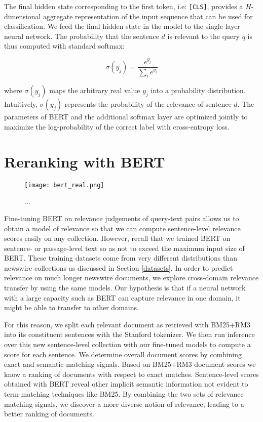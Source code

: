 The final hidden state corresponding to the first token, i.e: \texttt{[CLS]}, provides a $ H $-dimensional aggregate representation of the input sequence that can be used for classification.
We feed the final hidden state in the model to the single layer neural network.
The probability that the sentence $d$ is relevant to the query $q$ is thus computed with standard softmax:

\begin{equation}
\sigma (y_j) = \frac{e^{y_j}}{\sum_i e^{y_i}}
\end{equation}

where $\sigma (y_j)$ maps the arbitrary real value $y_j$ into a probability distribution.
Intuitively, $\sigma (y_j)$ represents the probability of the relevance of sentence $d$.
The parameters of BERT and the additional softmax layer are optimized jointly to maximize the log-probability of the correct label with cross-entropy loss.

\section{Reranking with BERT}

\begin{figure}[b!]
\centering
  \texttt{[image: bert\_real.png]}
\caption{...}
\label{fig:bert_real}
\end{figure}

Fine-tuning BERT on relevance judgements of query-text pairs allows us to obtain a model of relevance so that we can compute sentence-level relevance scores easily on any collection.
However, recall that we trained BERT on sentence- or passage-level text so as not to exceed the maximum input size of BERT.
These training datasets come from very different distributions than newswire collections as discussed in Section \ref{datasets}.
In order to predict relevance on much longer newswire documents, we explore cross-domain relevance transfer by using the same models.
Our hypothesis is that if a neural network with a large capacity such as BERT can capture relevance in one domain, it might be able to transfer to other domains.

For this reason, we split each relevant document as retrieved with BM25+RM3 into its constituent sentences with the Stanford tokenizer.
We then run inference over this new sentence-level collection with our fine-tuned models to compute a score for each sentence.
We determine overall document scores by combining exact and semantic matching signals.
Based on BM25+RM3 document scores we know a ranking of documents with respect to exact matches.
Sentence-level scores obtained with BERT reveal other implicit semantic information not evident to term-matching techniques like BM25.
By combining the two sets of relevance matching signals, we discover a more diverse notion of relevance, leading to a better ranking of documents.

